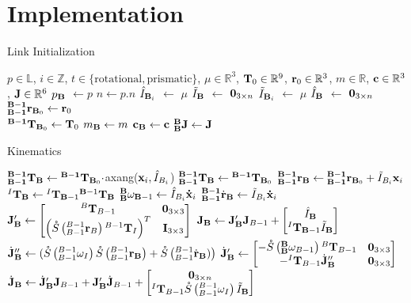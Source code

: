 \chapter{Implementation}

\begin{algorithm}[H]
	\caption{Link Initialization}\label{alg:link_init}
	\begin{algorithmic}
		\Require $p \in \mathbb{L}$, $i \in \mathbb{Z}$, $t \in \{\text{rotational}, \text{prismatic}\}$, $\mu \in \mathbb{R}^3$, $\T_0 \in \mathbb{R}^9$, $\r_0 \in \mathbb{R}^3$, $m \in \mathbb{R}$, $\com \in \mathbb{R}^3$, $\J \in \mathbb{R}^6$
		\State $p_\B$ $\gets p$ 
		\State $n \gets p.n$
		\State $\IHat_{\B_i}$ $\gets$ $\mu$
		\State $\ITilde_\B$ $\gets$ $\ZERO_{3 \times n}$
		\Else
		\State $\ITilde_{\B_i}$ $\gets$ $\mu$
		\State $\IHat_\B$ $\gets$ $\ZERO_{3 \times n}$
		\EndIf
		\State ${\BL}\r_{\B_0} \gets \r_0$\\
		\State ${^\mathbf{B-1}}\T_{\B_0} \gets \T_0$
		\State $m_\B \gets m$
		\State $\com_\B \gets \com$
		\State $\BB\J \gets \J$
	\end{algorithmic}
\end{algorithm}


\begin{algorithm}[H]
	\caption{Kinematics}\label{alg:kinematics}
	\begin{algorithmic}
		\If{$t_\B$  = rotational}
		\State ${\BL}\T_\B \gets {^\mathbf{B-1}}\T_{\B_0}\cdot$axang($\x_i , \IHat_{B_i}$)
		\Else
		\State ${\BL}\T_\B \gets {^\mathbf{B-1}}\T_{\B_0}$
		\EndIf
		\State $\BL\r_\B \gets {\BL}\r_{\B_0} + \ITilde_{B_i}\x_i$
		\State $^I\T_\B \gets {^I\T_{\B-1}}{^{\B-1}}\T_\B$
		\State $\BB\omega_{\B -1 } \gets \IHat_{B_i} \dotx_i$
		\State $\BL\dotr_{\B} \gets \ITilde_{B_i} \dotx_i$
		\State $\J_\B' \gets  \begin{bmatrix}
		{^B\T_{B - 1}}                                       & \ZERO_{3 \times 3} \\
		\left (\S{^{B-1}_{B-1}\r_B}{^{B-1}\T_{I}} \right )^T & \EYE_{3 \times 3}  
		\end{bmatrix}$
		\State $\J_\B \gets \J_\B' \J_{B-1} + \begin{bmatrix} 
		{\IHat_\B} \\
		{{^I\T_{\B-1}}\ITilde_\B}
		\end{bmatrix}$
		\State $\dotJ_\B'' \gets (\S{^{B-1}_{B-1}\omega_I}\S{^{B-1}_{B-1}\r_\B}+\S{^{B-1}_{B-1}\dotr_\B)}$
		\State $\dotJ_\B' \gets \begin{bmatrix}  
		-\S{\BB\omega_{B-1}}{^B\T_{B-1}}                                       & \ZERO_{3 \times 3} \\
		-{^I\T_{B-1}}
		\dotJ_\B'' & \ZERO_{3 \times 3} \\
		\end{bmatrix}$
		\State $\dotJ_\B \gets \dotJ_\B' \J_{B-1} + \J_\B' \dotJ_{B-1} + \begin{bmatrix} 
		\ZERO_{3 \times n} \\
		{{^I{\T}_{B-1}}\S{^{B-1}_{B-1}\omega_I}\ITilde_\B} \\
		\end{bmatrix}$
	\end{algorithmic}
\end{algorithm}

